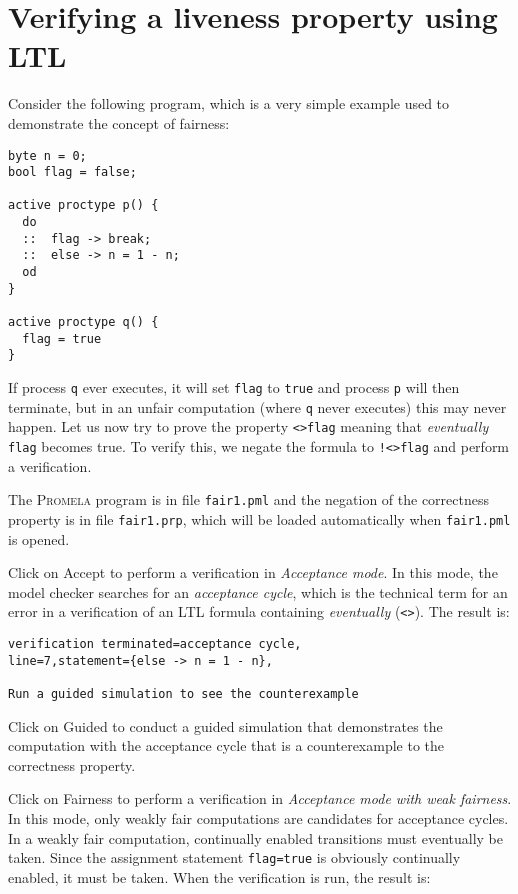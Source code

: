 \documentclass[11pt]{article}
\newcommand*{\prm}{\textsc{Promela}}
\newcommand*{\p}[1]{\texttt{#1}}
\newcommand*{\bu}[1]{\textsf{#1}}
\begin{document}
\section{Verifying a liveness property using LTL}

Consider the following program, which is a very simple example used to
demonstrate the concept of fairness:
\begin{verbatim}
byte n = 0;
bool flag = false;

active proctype p() {
  do
  ::  flag -> break;
  ::  else -> n = 1 - n;
  od
}

active proctype q() {
  flag = true
}
\end{verbatim}

If process \p{q} ever executes, it will set \p{flag} to \p{true} and
process \p{p} will then terminate, but in an unfair computation (where
\p{q} never executes) this may never happen. Let us now try to prove the
property \p{<>flag} meaning that \emph{eventually} \p{flag} becomes
true. To verify this, we negate the formula to \p{!<>flag} and perform a
verification.

The \prm{} program is in file \p{fair1.pml} and the negation of the
correctness property is in file \p{fair1.prp}, which will be loaded
automatically when \p{fair1.pml} is opened.

Click on \bu{Accept} to perform a verification in \emph{Acceptance
mode}. In this mode, the model checker searches for an \emph{acceptance
cycle}, which is the technical term for an error in a verification of an
LTL formula containing \emph{eventually} (\p{<>}). The result is:

\begin{verbatim}
verification terminated=acceptance cycle,
line=7,statement={else -> n = 1 - n},

Run a guided simulation to see the counterexample
\end{verbatim}

Click on \bu{Guided} to conduct a guided simulation that demonstrates
the computation with the acceptance cycle that is a counterexample to
the correctness property.

Click on \bu{Fairness} to perform a verification in \emph{Acceptance
mode with weak fairness}. In this mode, only weakly fair computations
are candidates for acceptance cycles. In a weakly fair computation,
continually enabled transitions must eventually be taken. Since the
assignment statement \p{flag=true} is obviously continually enabled, it
must be taken. When the verification is run, the result is:
\end{document}
